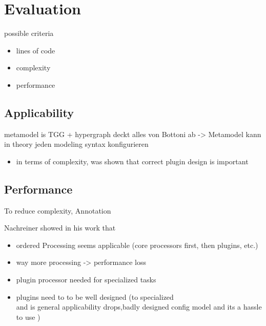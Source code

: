 \chapter{Evaluation}

possible criteria
\begin{itemize}
  \item lines of code
  \item complexity
  \item performance
\end{itemize}

\section{Applicability}
metamodel is TGG + hypergraph deckt alles von Bottoni ab -> Metamodel kann in theory jeden modeling syntax konfigurieren

\begin{itemize}
  \item in terms of complexity, was shown that correct plugin design is important
\end{itemize}


\section{Performance}
To reduce complexity, Annotation



Nachreiner showed in his work \cite{nachreiner_couchedit_2020} that 



\begin{itemize}
  \item ordered Processing seems applicable (core processors first, then plugins, etc.)
  \item way more processing -> performance loss
  \item plugin processor needed for specialized tasks
  \item plugins need to to be well designed (to specialized\\
        and is general applicability drops,badly designed config model and its a hassle to use )
\end{itemize}

